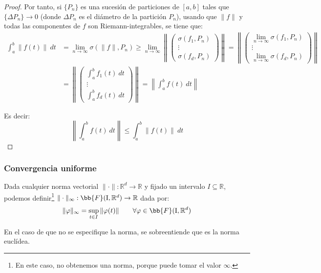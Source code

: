 \begin{prop}
\begin{proof}
        Por tanto, si $\{P_n\}$ es una sucesión de particiones de $[a,b]$ tales que $\{\Delta P_n\}\longrightarrow 0$ (donde $\Delta P_n$ es el diámetro de la partición $P_n$), usando que $\|f\|$ y todas las componentes de $f$ son Riemann-integrables, se tiene que:
        \begin{align*}
            \int_{a}^{b} \|f(t)\|~dt &= \lim_{n\to\infty}\sigma(\|f\|, P_n) \geq \lim_{n\to\infty} \left\| \left(\begin{array}{c}
                \sigma(f_1,P_n) \\
                \vdots  \\
                \sigma(f_d,P_n) 
            \end{array}\right) \right\|    = \left\| \left(\begin{array}{c}
                \displaystyle\lim_{n\to\infty} \sigma(f_1,P_n) \\
                \vdots  \\
                \displaystyle\lim_{n\to\infty}  \sigma(f_d,P_n) 
            \end{array}\right) \right\| \\
                                     &=  \left\| \left(\begin{array}{c}
                \int_{a}^{b} f_1(t)~dt  \\
                \vdots \\
                \int_{a}^{b} f_d(t)~dt  
            \end{array}\right) \right\| = \left\|\int_{a}^{b} f(t)~dt \right\|
        \end{align*}

        Es decir:
    \begin{equation*}
        \left\|\int_{a}^{b} f(t)~dt \right\| \leq \int_{a}^{b} \|f(t)\|~dt 
    \end{equation*}
    \end{proof}
\end{prop}

\subsubsection{Convergencia uniforme}
\noindent
Dada cualquier norma vectorial $\|\cdot \|:\mathbb{R}^d\rightarrow\mathbb{R}$ y fijado un intervalo $I\subseteq \mathbb{R}$, podemos definir\footnote{En este caso, no obtenemos una norma, porque puede tomar el valor $\infty$.} $\|\cdot \|_\infty:\bb{F}(\text{I},\mathbb{R}^d)\rightarrow\mathbb{R}$ dada por:
\begin{equation*}
    \|\varphi\|_\infty = \sup_{t\in I}\|\varphi(t)\| \qquad \forall \varphi \in \bb{F}(\text{I},\mathbb{R}^d)
\end{equation*}
\begin{observacion}
    En el caso de que no se especifique la norma, se sobreentiende que es la norma euclídea.
\end{observacion}

